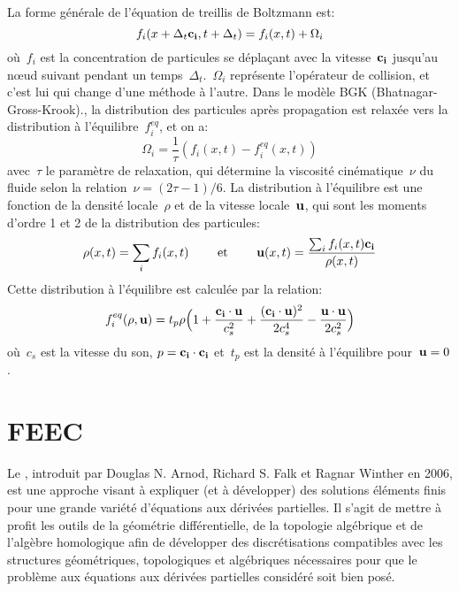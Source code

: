 \medskip
La forme générale de l'équation de treillis de Boltzmann est:
\begin{equation}
f_i(x+\Delta_t \mathbf{c_i}, t+\Delta_t) = f_i(x,t) + \Omega_i
\end{equation}
où~$f_i$ est la concentration de particules se déplaçant avec la vitesse~$\mathbf{c_i}$ jusqu'au nœud suivant pendant un temps~$\Delta_t$.~$\Omega_i$ représente l'opérateur de collision, et c'est lui qui change d'une méthode à l'autre. Dans le modèle BGK (Bhatnagar-Gross-Krook)., la distribution des particules après propagation est relaxée vers la distribution à l'équilibre~$f_i^{eq}$, et on a:
\begin{equation}
\Omega_i = \frac1{\tau}\left(f_i(x,t)-f_i^{eq}(x,t)\right)
\end{equation}
avec~$\tau$ le paramètre de relaxation, qui détermine la viscosité cinématique~$\nu$ du fluide selon la relation~$\nu=(2\tau -1)/6$. La distribution à l'équilibre est une fonction de la densité locale~$\rho$ et de la vitesse locale~$\mathbf{u}$, qui sont les moments d'ordre 1 et 2 de la distribution des particules:
\begin{equation}
\rho(x,t) = \displaystyle\sum_i f_i(x,t) \qquad\text{ et }\qquad \mathbf{u}(x,t)=\dfrac{\sum_i f_i(x,t)\mathbf{c_i}}{\rho(x,t)}
\end{equation}
Cette distribution à l'équilibre est calculée par la relation:
\begin{equation}
f_i^{eq}(\rho,\mathbf{u}) = t_p \rho \Bigl(1+\dfrac{\mathbf{c_i}\cdot\mathbf{u}}{c_s^2} + \dfrac{(\mathbf{c_i}\cdot\mathbf{u})^2}{2c_s^4} - \dfrac{\mathbf{u}\cdot\mathbf{u}}{2c_s^2}\Bigr)
\end{equation}
où~$c_s$ est la vitesse du son, $p=\mathbf{c_i}\cdot\mathbf{c_i}$ et~$t_p$ est la densité à l'équilibre pour~$\mathbf{u}=0$.






\medskip{}
\section{FEEC}

Le , introduit par Douglas N. Arnod, Richard S. Falk et Ragnar Winther en 2006, est une approche visant à expliquer (et à développer) des solutions éléments finis pour une grande variété d'équations aux dérivées partielles. Il s'agit de mettre à profit les outils de la géométrie différentielle, de la topologie algébrique et de l'algèbre homologique afin de développer des discrétisations compatibles avec les structures géométriques, topologiques et algébriques nécessaires pour que le problème aux équations aux dérivées partielles considéré soit bien posé.

